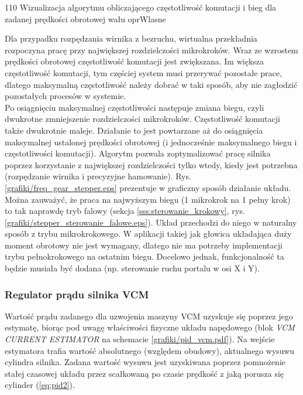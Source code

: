 	{110}
	{Wizualizacja algorytmu obliczającego częstotliwość komutacji i bieg dla zadanej prędkości obrotowej wału}
	{oprWlasne}

Dla przypadku rozpędzania wirnika z bezruchu, wirtualna przekładnia rozpoczyna pracę przy największej rozdzielczości mikrokroków. Wraz ze wzrostem prędkości obrotowej częstotliwość komutacji jest zwiększana. Im większa częstotliwość komutacji, tym częściej system musi przerywać pozostałe prace, dlatego maksymalną częstotliwość należy dobrać w taki sposób, aby nie zagłodzić pozostałych procesów w systemie. \\

Po osiągnięciu maksymalnej częstotliwości następuje zmiana biegu, czyli dwukrotne zmniejszenie rozdzielczości mikrokroków. Częstotliwość komutacji także dwukrotnie maleje. Działanie to jest powtarzane aż do osiągnięcia maksymalnej ustalonej prędkości obrotowej (i jednocześnie maksymalnego biegu i częstotliwości komutacji). Algorytm pozwala zoptymalizować pracę silnika poprzez korzystanie z największej rozdzielczości tylko wtedy, kiedy jest potrzebna (rozpędzanie wirnika i precyzyjne hamowanie). Rys. \ref{grafiki/freq_gear_stepper.eps} prezentuje w graficzny sposób działanie układu. \\

Można zauważyć, że praca na najwyższym biegu (1 mikrokrok na 1 pełny krok) to tak naprawdę tryb falowy (sekcja \ref{sss:sterowanie_krokowy}, rys. \ref{grafiki/stepper_sterowanie_falowe.eps}). Układ przechodzi do niego w naturalny sposób z trybu mikrokrokowego. W aplikacji takiej jak głowica układająca duży moment obrotowy nie jest wymagany, dlatego nie ma potrzeby implementacji trybu pełnokrokowego na ostatnim biegu. Docelowo jednak, funkcjonalność ta będzie musiała być dodana (np. sterowanie ruchu portalu w osi X i Y).

\subsubsection{Regulator prądu silnika VCM}

Wartość prądu zadanego dla uzwojenia maszyny VCM uzyskuje się poprzez jego estymatę, biorąc pod uwagę właściwości fizyczne układu napędowego (blok {\it VCM CURRENT ESTIMATOR} na schemacie \ref{grafiki/pid_vcm.pdf}). Na wejście estymatora trafia wartość absolutnego (względem obudowy), aktualnego wysuwu cylindra silnika. Zadana wartość wysuwu jest uzyskiwana poprzez pomnożenie stałej czasowej układu przez scałkowaną po czasie prędkość z jaką porusza się cylinder (\ref{eq:pid2}).

